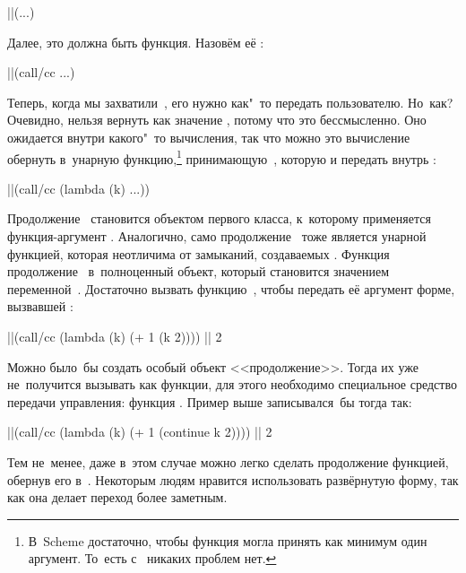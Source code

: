 \begin{code:lisp}
||(...)
\end{code:lisp}

Далее, это должна быть функция. Назовём её :

\begin{code:lisp}
||(call/cc ...)
\end{code:lisp}

Теперь, когда мы захватили~, его нужно как"~то передать пользователю.
Но~как? Очевидно, нельзя вернуть  как значение , потому что
это бессмысленно. Оно ожидается внутри какого"~то вычисления, так что можно это
вычисление обернуть в~унарную функцию,\footnote*{В~Scheme достаточно, чтобы
функция могла принять как минимум один аргумент. То~есть с~
никаких проблем нет.} принимающую~, которую и передать внутрь
:

\begin{code:lisp}
||(call/cc (lambda (k) ...))
\end{code:lisp}

Продолжение~ становится объектом первого класса, к~которому применяется
функция-аргумент . Аналогично, само продолжение~ тоже является
унарной функцией, которая неотличима от замыканий, создаваемых .
Функция   продолжение~ в~полноценный объект,
который становится значением переменной~. Достаточно вызвать
функцию~, чтобы передать её аргумент форме, вызвавшей :

\begin{code:lisp}
||(call/cc (lambda (k) (+ 1 (k 2)))) |\is| 2
\end{code:lisp}

Можно было~бы создать особый объект <<продолжение>>. Тогда их уже не~получится
вызывать как функции, для этого необходимо специальное средство передачи
управления: функция . Пример выше записывался~бы тогда так:

\begin{code:lisp}
||(call/cc (lambda (k) (+ 1 (continue k 2)))) |\is| 2
\end{code:lisp}

Тем не~менее, даже в~этом случае можно легко сделать продолжение функцией,
обернув его в~. Некоторым людям нравится
использовать развёрнутую форму, так как она делает переход более заметным.

